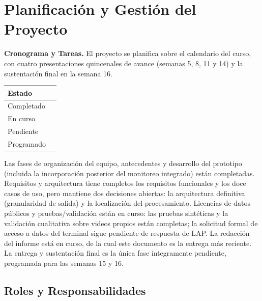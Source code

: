 \section{Planificación y Gestión del Proyecto}
\label{sec:planificacion}

\textbf{Cronograma y Tareas.} El proyecto se planifica sobre el calendario del curso, con
cuatro presentaciones quincenales de avance (semanas 5, 8, 11 y 14) y la sustentación final en
la semana 16.

\begin{center}
\begin{tabular}{@{}ll@{}}
\toprule
\textbf{Estado} & \\
\midrule
Completado & \\
En curso & \\
Pendiente & \\
Programado & \\
\bottomrule
\end{tabular}
\end{center}


Las fases de organización del equipo, antecedentes y desarrollo del prototipo (incluida la
incorporación posterior del monitoreo integrado) están completadas. Requisitos y arquitectura
tiene completos los requisitos funcionales y los doce casos de uso, pero mantiene dos
decisiones abiertas: la arquitectura definitiva (granularidad de salida) y la localización del
procesamiento. Licencias de datos públicos y pruebas/validación están en curso: las pruebas
sintéticas y la validación cualitativa sobre videos propios están completas; la solicitud formal
de acceso a datos del terminal sigue pendiente de respuesta de LAP. La redacción del informe
está en curso, de la cual este documento es la entrega más reciente. La entrega y sustentación
final es la única fase íntegramente pendiente, programada para las semanas 15 y 16.

\subsection{Roles y Responsabilidades}
\label{subsec:roles-responsabilidades}

